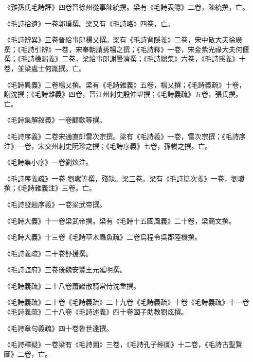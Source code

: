 \begin{pinyinscope}
 《難孫氏毛詩評》四卷晉徐州從事陳統撰。梁有《毛詩表隱》二卷，陳統撰，亡。



 《毛詩拾遺》一卷郭璞撰。梁又有《毛詩略》四卷，亡。



 《毛詩辨異》三卷晉給事郎楊乂撰。梁有《毛詩背隱義》二卷，宋中散大夫徐廣撰；《毛詩引辨》一卷，宋奉朝請孫暢之撰；《毛詩釋》一卷，宋金紫光祿大夫何偃撰；《毛詩檢漏義》二卷，梁給事郎謝曇濟撰；《毛詩總集》六卷，《毛詩隱義》十卷，並梁處士何胤撰。亡。



 《毛詩異義》二卷楊乂撰。梁有《毛詩雜義》五卷，楊乂撰；《毛詩義疏》十卷，謝沈撰；《毛詩雜義》四卷，晉江州刺史殷仲堪撰；《毛詩義疏》五卷，張氏撰。亡。



 《毛詩集解敘義》一卷顧歡等撰。



 《毛詩序義》二卷宋通直郎雷次宗撰。梁有《毛詩義》一卷，雷次宗撰；《毛詩序注》一卷，宋交州刺史阮珍之撰；《毛詩序義》七卷，孫暢之撰。亡。



 《毛詩集小序》一卷劉炫注。



 《毛詩序義疏》一卷
 劉瓛等撰，殘缺。梁三卷。梁有《毛詩篇次義》一卷，劉瓛撰；《毛詩雜義注》三卷。亡。



 《毛詩發題序義》一卷梁武帝撰。



 《毛詩大義》十一卷梁武帝撰。梁有《毛詩十五國風義》二十卷，梁簡文撰。



 《毛詩大義》十三卷《毛詩草木蟲魚疏》二卷烏程令吳郡陸機撰。



 《毛詩義疏》二十卷舒援撰。



 《毛詩誼府》三卷後魏安豐王元延明撰。



 《毛詩義疏》二十八卷蕭巋散騎常侍沈重撰。



 《毛詩義疏》二十卷《毛詩義疏》二十九卷《毛詩義疏》十卷《毛詩義疏》十一卷《毛詩義疏》二十八卷《毛詩述義》四十卷國子助教劉炫撰。



 《毛詩章句義疏》四十卷魯世達撰。



 《毛詩釋疑》一卷梁有《毛詩圖》三卷，《毛詩孔子經圖》十二卷，《毛詩古聖賢圖》二卷，亡。




\end{pinyinscope}
